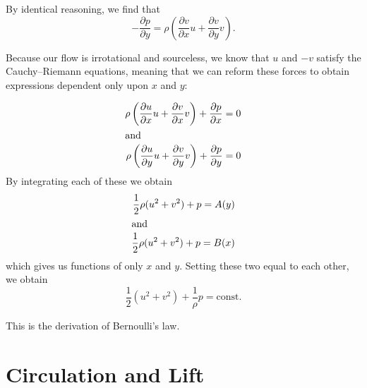 \documentclass[letterpaper, twoside, 12 pt]{article}
\begin{document}
	By identical reasoning, we find that
	\[
		- \frac{\partial p}{\partial y} = \rho \left( \frac{\partial v}{\partial x} u + \frac{\partial v}{\partial y} v \right).
	\]
	
	Because our flow is irrotational and sourceless, we know that $u$ and $-v$ satisfy the Cauchy--Riemann equations, meaning that we can reform these forces to obtain expressions dependent only upon $x$ and $y$:

	\begin{align*}
		\rho \left( \frac{\partial u}{\partial x} u + \frac{\partial v}{\partial x} v \right) + \frac{\partial p}{\partial x} &= 0 \\
		\intertext{and}
		\rho \left( \frac{\partial u}{\partial y} u + \frac{\partial v}{\partial y} v \right) + \frac{\partial p}{\partial y} &= 0 \\
	\end{align*}
	By integrating each of these we obtain
	\begin{align*}
		\frac{1}{2} \rho (u^2 + v^2) + p = A(y) \\
		\intertext{and}
		\frac{1}{2} \rho (u^2 + v^2) + p = B(x) \\
	\end{align*}
	which gives us functions of only $x$ and $y$.
	Setting these two equal to each other, we obtain
	\[
		\frac{1}{2} (u^2 + v^2) + \frac{1}{\rho} p = \mathrm{const.}
	\]

	This is the derivation of Bernoulli's law.

\section{Circulation and Lift} %
\label{sec:circulation_and_lift}
\end{document}
